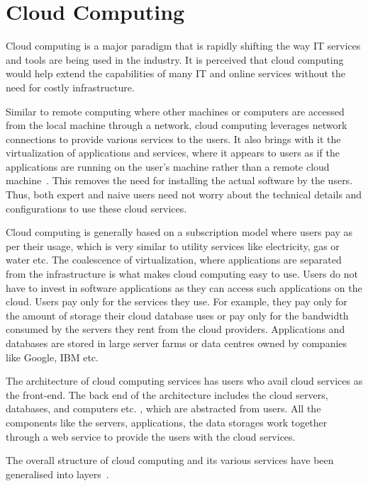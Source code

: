 \section{Cloud Computing} \label{s:cloudComputing}
Cloud computing is a major paradigm that is rapidly shifting the way \ac{IT}
services and tools are being used in the industry.  It is perceived that cloud
computing would help extend the capabilities of many \ac{IT} and online services
without the need for costly infrastructure.

Similar to remote computing where other machines or computers are accessed from
the local machine through a network,   cloud computing leverages network
connections to provide various services to the users.  It also brings with it
the virtualization of applications and services,   where it appears to users as
if the applications are running on the user's machine rather than a remote cloud
machine~\citep{cloudcomputingdefined}.  This removes the need for
installing the actual software by the users.  Thus,   both expert and naive
users need not worry about the technical details and configurations to use these
cloud services.

Cloud computing is generally based on a subscription model where users pay as
per their usage,   which is very similar to utility services like electricity,  
gas or water etc.  The coalescence of virtualization,   where applications are
separated from the infrastructure is what makes cloud computing easy to use.
Users do not have to invest in software applications as they can access such
applications on the cloud.  Users pay only for the services they use.  For
example,   they pay only for the amount of storage their cloud database uses or
pay only for the bandwidth consumed by the servers they rent from the cloud
providers.  Applications and databases are stored in large server farms or data
centres owned by companies like Google,  IBM etc.

The architecture of cloud computing services has users who avail cloud services
as the front-end.  The back end of the architecture includes the cloud servers,
databases,   and computers etc. ,   which are abstracted from users.  All the
components like the servers,   applications,   the data storages work together
through a web service to provide the users with the cloud services. 

The overall structure of cloud computing and its various services have been
generalised into layers~\citep{Spring1,Spring2,DeLeon}.

